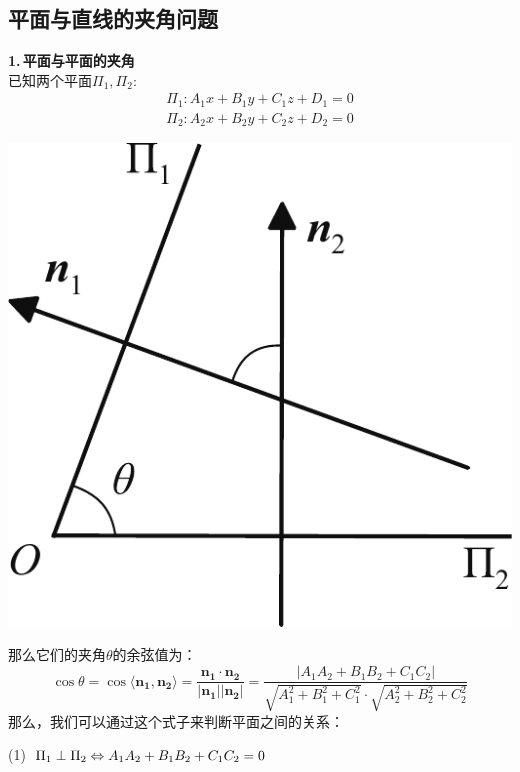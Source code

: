 \noindent
\begin{minipage}{0.6\linewidth}
\subsection{平面与直线的夹角问题}
\textbf{1.$\,$平面与平面的夹角}\\[0.5em]
\hspace*{2em} 已知两个平面$\Pi_1,\Pi_2$:
\begin{equation*}
	\begin{split}
		\Pi_1:A_1x+B_1y+C_1z+D_1=0\\
		\Pi_2: A_2x+B_2y+C_2z+D_2=0
	\end{split}
\end{equation*}
\end{minipage}
\begin{minipage}{0.4\linewidth}
	\centering
	\includegraphics[width = 0.55\linewidth]{pic/C-5/planeang}
	\vspace*{-1em}
	\label{平面与皮昂面的夹角}
\end{minipage}

\noindent 那么它们的夹角$\theta$的余弦值为：
\begin{equation}
	\cos \theta=\cos\langle \boldsymbol{n_1},\boldsymbol{n_2}\rangle =\frac{\boldsymbol{n_1}\cdot\boldsymbol{n_2}}{|\boldsymbol{n_1}||\boldsymbol{n_2}|}=\frac{|A_1A_2+B_1B_2+C_1C_2|}{\sqrt{A_1^2+B_1^2+C_1^2}\cdot\sqrt{A_2^2+B_2^2+C_2^2}}
\end{equation}
那么，我们可以通过这个式子来判断平面之间的关系：

(1)$\hspace*{0.5em} \Pi_1\perp \Pi_2 \Leftrightarrow  A_1A_2+B_1B_2+C_1C_2=0$
\vspace*{0.5em}

